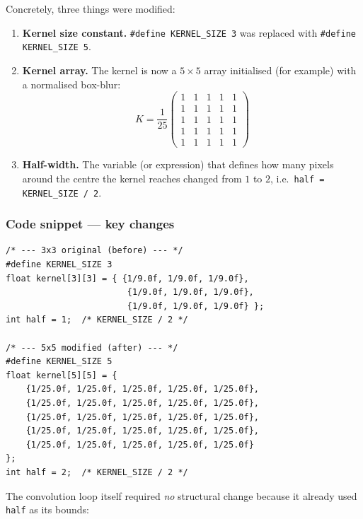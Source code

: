 \documentclass[12pt,a4paper]{article}
\begin{document}
Concretely, three things were modified:

\begin{enumerate}[label=\arabic*.]
    \item \textbf{Kernel size constant.}
          \texttt{\#define KERNEL\_SIZE 3} was replaced with
          \texttt{\#define KERNEL\_SIZE 5}.
    \item \textbf{Kernel array.}
          The kernel is now a \(5\times 5\) array initialised (for example)
          with a normalised box-blur:
          \[
              K = \frac{1}{25}\begin{pmatrix}
                  1 & 1 & 1 & 1 & 1 \\
                  1 & 1 & 1 & 1 & 1 \\
                  1 & 1 & 1 & 1 & 1 \\
                  1 & 1 & 1 & 1 & 1 \\
                  1 & 1 & 1 & 1 & 1
              \end{pmatrix}
          \]
    \item \textbf{Half-width.}
          The variable (or expression) that defines how many pixels around the
          centre the kernel reaches changed from \(1\) to \(2\), i.e.\
          \texttt{half = KERNEL\_SIZE / 2}.
\end{enumerate}

\subsubsection*{Code snippet — key changes}

\begin{lstlisting}
/* --- 3x3 original (before) --- */
#define KERNEL_SIZE 3
float kernel[3][3] = { {1/9.0f, 1/9.0f, 1/9.0f},
                        {1/9.0f, 1/9.0f, 1/9.0f},
                        {1/9.0f, 1/9.0f, 1/9.0f} };
int half = 1;  /* KERNEL_SIZE / 2 */

/* --- 5x5 modified (after) --- */
#define KERNEL_SIZE 5
float kernel[5][5] = {
    {1/25.0f, 1/25.0f, 1/25.0f, 1/25.0f, 1/25.0f},
    {1/25.0f, 1/25.0f, 1/25.0f, 1/25.0f, 1/25.0f},
    {1/25.0f, 1/25.0f, 1/25.0f, 1/25.0f, 1/25.0f},
    {1/25.0f, 1/25.0f, 1/25.0f, 1/25.0f, 1/25.0f},
    {1/25.0f, 1/25.0f, 1/25.0f, 1/25.0f, 1/25.0f}
};
int half = 2;  /* KERNEL_SIZE / 2 */
\end{lstlisting}

The convolution loop itself required \emph{no} structural change because it
already used \texttt{half} as its bounds:
\end{document}
